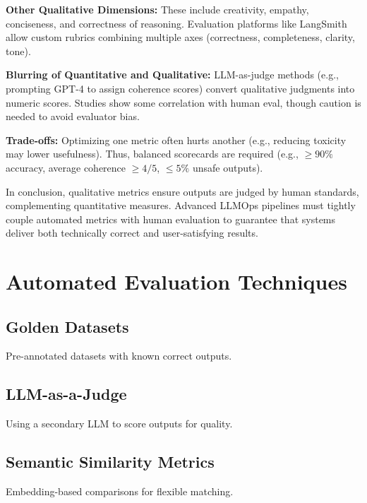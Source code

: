 \textbf{Other Qualitative Dimensions:} These include creativity, empathy, conciseness, and correctness of reasoning. Evaluation platforms like LangSmith allow custom rubrics combining multiple axes (correctness, completeness, clarity, tone).  

\textbf{Blurring of Quantitative and Qualitative:} LLM-as-judge methods (e.g., prompting GPT-4 to assign coherence scores) convert qualitative judgments into numeric scores. Studies show some correlation with human eval, though caution is needed to avoid evaluator bias.  

\textbf{Trade-offs:} Optimizing one metric often hurts another (e.g., reducing toxicity may lower usefulness). Thus, balanced scorecards are required (e.g., $\geq 90\%$ accuracy, average coherence $\geq 4/5$, $\leq 5\%$ unsafe outputs).  

In conclusion, qualitative metrics ensure outputs are judged by human standards, complementing quantitative measures. Advanced LLMOps pipelines must tightly couple automated metrics with human evaluation to guarantee that systems deliver both technically correct and user-satisfying results.

\section{Automated Evaluation Techniques}
\label{sec:ch10-automated-evaluation-techniques}

\subsection{Golden Datasets}
Pre-annotated datasets with known correct outputs.

\subsection{LLM-as-a-Judge}
Using a secondary LLM to score outputs for quality.

\subsection{Semantic Similarity Metrics}
Embedding-based comparisons for flexible matching.

